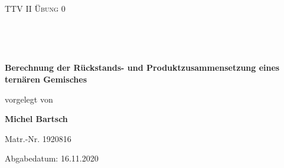 \begin{center}
\begin{tabular}

\begin{center}
\hfill
\end{center}

\\
\vspace{2.0cm}
\begin{center}
\huge{\textsc{
TTV II Übung 0
}}
\end{center}

\\
\vspace{0.3cm}


\vspace{0.2cm}
\\
\begin{center}
\textbf{\LARGE{Berechnung der Rückstands- und Produktzusammensetzung eines ternären Gemisches}}
\end{center}

\vspace{0.3cm}

\begin{center}
\large{vorgelegt von}
\end{center}

\vspace{0.3cm}

\begin{center}
\large{\textbf{Michel Bartsch}}
\end{center}
\vspace{0.2 cm}
\begin{center}
\large{Matr.-Nr. 1920816}
\end{center}
\vspace{0.9cm}
\begin{center}
\large{Abgabedatum: 16.11.2020}
\end{center}

\vspace{2 cm}
\begin{center}
\end{center}
\end{tabular}
\end{center}
